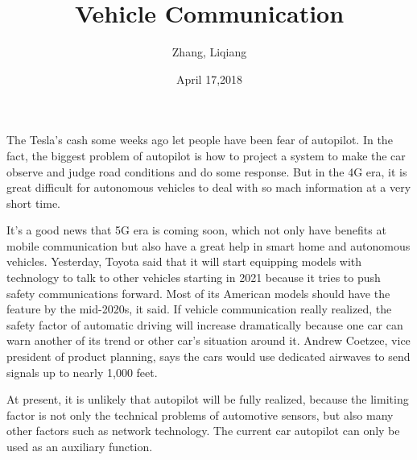 \documentclass{article}
\author{Zhang, Liqiang}
\date{April 17,2018}
\title{Vehicle Communication}
\begin{document}
\maketitle
\par
The Tesla's cash some weeks ago let people have been fear of autopilot. In the fact, the biggest problem of autopilot is how to project a system to make the car observe and judge road conditions and do some response. But in the 4G era, it is great difficult for autonomous vehicles to deal with so mach information at a very short time.  
\par
It's a  good news that 5G era is coming soon, which not only have benefits at mobile communication but also have a great help in smart home and autonomous vehicles. Yesterday, Toyota said that it will start equipping models with technology to talk to other vehicles starting in 2021 because it tries to push safety communications forward. Most of its American models should have the feature by the mid-2020s, it said. If vehicle communication really realized, the safety factor of automatic driving will increase dramatically because one car can warn another of its trend or other car's situation around it. Andrew Coetzee, vice president of product planning, says the cars would use dedicated airwaves to send signals up to nearly 1,000 feet.
\par
At present, it is unlikely that autopilot will be fully realized, because the limiting factor is not only the technical problems of automotive sensors, but also many other factors such as network technology. The current car autopilot can only be used as an auxiliary function.
\end{document}
